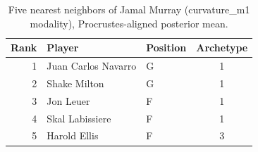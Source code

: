 \begin{table}[htbp]
  \centering\small
  \begin{tabular}{rllc}
    \toprule
    Rank & Player & Position & Archetype \\
    \midrule
    1 & Juan Carlos Navarro & G & 1 \\
    2 & Shake Milton & G & 1 \\
    3 & Jon Leuer & F & 1 \\
    4 & Skal Labissiere & F & 1 \\
    5 & Harold Ellis & F & 3 \\
    \bottomrule
  \end{tabular}
  \caption{Five nearest neighbors of Jamal Murray (curvature_m1 modality), Procrustes-aligned posterior mean.}
  \label{tab:Jamal_Murray_neighbors_curvature_m1}
\end{table}


